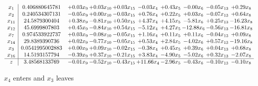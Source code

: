\documentclass[9pt]{article}
\begin{document}
 \[\begin{array}{c| c c@{\hskip 2pt} c@{\hskip 2pt} c@{\hskip 2pt} c@{\hskip 2pt} c@{\hskip 2pt} c@{\hskip 2pt} c@{\hskip 2pt} c@{\hskip 2pt} }
 x_{1}   &  0.406880645781 & +  0.03 x_{9} & +  0.03 x_{10} & +  0.03 x_{15} & -0.03 x_{4} & +  0.43 x_{5} & -0.00 x_{6} & -0.05 x_{13} & +  0.29 x_{8}\\
 x_{2}   &  0.240534307131 & -0.05 x_{9} & +  0.00 x_{10} & -0.03 x_{15} & +  0.76 x_{4} & +  0.22 x_{5} & +  0.03 x_{6} & -0.07 x_{13} & +  0.64 x_{8}\\
 x_{11}   &  24.5879300404 & +  0.38 x_{9} & -0.81 x_{10} & +  0.50 x_{15} & +  4.37 x_{4} & +  4.15 x_{5} & -5.81 x_{6} & +  0.25 x_{13} & -16.23 x_{8}\\
 x_{12}   &  45.6999807803 & +  0.45 x_{9} & -0.84 x_{10} & +  0.54 x_{15} & -5.12 x_{4} & +  4.27 x_{5} & -12.88 x_{6} & -0.56 x_{13} & -16.81 x_{8}\\
 x_{7}   &  0.974533922737 & +  0.03 x_{9} & -0.08 x_{10} & -0.05 x_{15} & +  1.16 x_{4} & +  0.11 x_{5} & +  0.11 x_{6} & -0.04 x_{13} & +  0.09 x_{8}\\
 x_{14}   &  29.8389390736 & +  0.02 x_{9} & -0.77 x_{10} & -0.05 x_{15} & +  0.53 x_{4} & +  2.84 x_{5} & -4.02 x_{6} & +  0.57 x_{13} & -19.16 x_{8}\\
 x_{3}   &  0.0541995002883 & +  0.00 x_{9} & +  0.09 x_{10} & -0.02 x_{15} & -0.38 x_{4} & +  0.45 x_{5} & +  0.39 x_{6} & +  0.04 x_{13} & +  0.68 x_{8}\\
 x_{16}   &  14.5193157794 & -0.39 x_{9} & +  0.37 x_{10} & -0.21 x_{15} & +  3.83 x_{4} & -4.90 x_{5} & -5.02 x_{6} & +  0.32 x_{13} & -2.07 x_{8}\\
\hline
z    &  3.48568133769 & -0.01 x_{9} & -0.52 x_{10} & -0.43 x_{15} & + 11.66 x_{4} & -2.96 x_{5} & -0.43 x_{6} & -0.10 x_{13} & -0.10 x_{8}\\
\end{array}\]


 $ x_{4} $ enters and $ x_{3} $ leaves 
\end{document}
